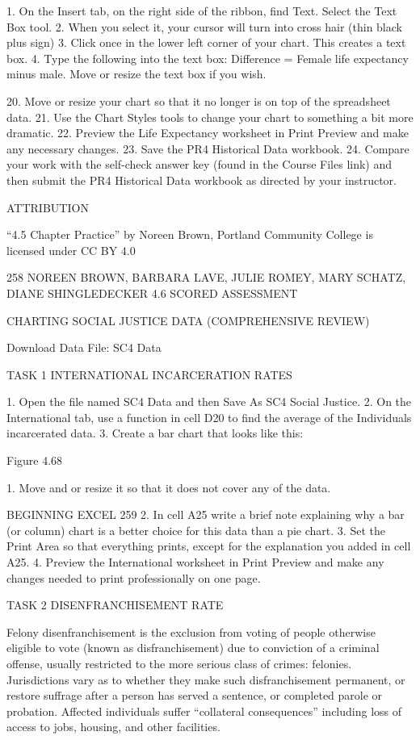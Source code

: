 1.   On the Insert tab, on the right side of the ribbon, find Text. Select the Text Box tool.
2.   When you select it, your cursor will turn into cross hair (thin black plus sign)
3.   Click once in the lower left corner of your chart. This creates a text box.
4.   Type the following into the text box: Difference = Female life expectancy minus male.
Move or resize the text box if you wish.

20.   Move or resize your chart so that it no longer is on top of the spreadsheet data.
21.   Use the Chart Styles tools to change your chart to something a bit more dramatic.
22.   Preview the Life Expectancy worksheet in Print Preview and make any necessary changes.
23.   Save the PR4 Historical Data workbook.
24.   Compare your work with the self-check answer key (found in the Course Files link) and then
submit the PR4 Historical Data workbook as directed by your instructor.

ATTRIBUTION

“4.5 Chapter Practice” by Noreen Brown, Portland Community College is licensed under CC BY 4.0




258 NOREEN BROWN, BARBARA LAVE, JULIE ROMEY, MARY SCHATZ, DIANE SHINGLEDECKER
4.6 SCORED ASSESSMENT




CHARTING SOCIAL JUSTICE DATA (COMPREHENSIVE REVIEW)

Download Data File: SC4 Data

TASK 1 INTERNATIONAL INCARCERATION RATES

1. Open the file named SC4 Data and then Save As SC4 Social Justice.
2. On the International tab, use a function in cell D20 to find the average of the Individuals
incarcerated data.
3. Create a bar chart that looks like this:




Figure 4.68


1. Move and or resize it so that it does not cover any of the data.


BEGINNING EXCEL 259
2. In cell A25 write a brief note explaining why a bar (or column) chart is a better choice for this
data than a pie chart.
3. Set the Print Area so that everything prints, except for the explanation you added in cell A25.
4. Preview the International worksheet in Print Preview and make any changes needed to print
professionally on one page.

TASK 2 DISENFRANCHISEMENT RATE

Felony disenfranchisement is the exclusion from voting of people otherwise eligible to vote (known
as disfranchisement) due to conviction of a criminal offense, usually restricted to the more serious
class of crimes: felonies. Jurisdictions vary as to whether they make such disfranchisement permanent,
or restore suffrage after a person has served a sentence, or completed parole or probation. Affected
individuals suffer “collateral consequences” including loss of access to jobs, housing, and other
facilities.

